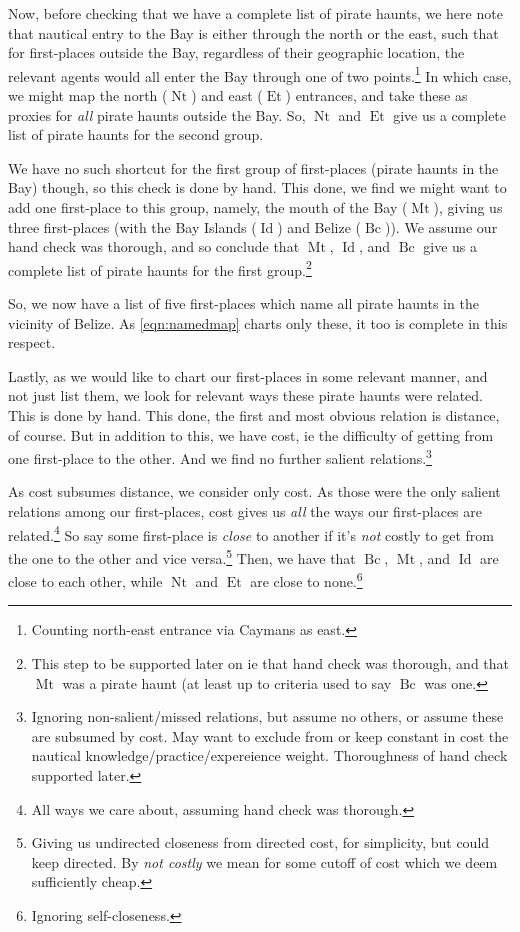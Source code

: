 \documentclass{amsart}
\newcommand{\ment}[1]{\textit{#1}} %
\DeclareMathOperator{\id}{Id} %
\DeclareMathOperator{\mt}{Mt} %
\DeclareMathOperator{\bc}{Bc} %
\DeclareMathOperator{\et}{Et} %
\DeclareMathOperator{\nt}{Nt} %
\theoremstyle{definition}
\theoremstyle{remark}
\begin{document}
			Now, before checking that we have a complete list of pirate haunts, we here note that nautical entry to the Bay is either through the north or the east, such that for first-places outside the Bay, regardless of their geographic location, the relevant agents would all enter the Bay through one of two points.\footnote{Counting north-east entrance via Caymans as east.} In which case, we might map the north (\(\nt\)) and east (\(\et\)) entrances, and take these as proxies for \emph{all} pirate haunts outside the Bay. So, \(\nt\) and \(\et\) give us a complete list of pirate haunts for the second group.
		
			We have no such shortcut for the first group of first-places (pirate haunts in the Bay) though, so this check is done by hand. This done, we find we might want to add one first-place to this group, namely, the mouth of the Bay (\(\mt\)), giving us three first-places (with the Bay Islands (\(\id\)) and Belize (\(\bc\))). We assume our hand check was thorough, and so conclude that \(\mt\), \(\id\), and \(\bc\) give us a complete list of pirate haunts for the first group.\footnote{This step to be supported later on ie that hand check was thorough, and that \(\mt\) was a pirate haunt (at least up to criteria used to say \(\bc\) was one.}
		
			So, we now have a list of five first-places which name all pirate haunts in the vicinity of Belize. As \ref{eqn:namedmap} charts only these, it too is complete in this respect.
		
			Lastly, as we would like to chart our first-places in some relevant manner, and not just list them, we look for relevant ways these pirate haunts were related. This is done by hand. This done, the first and most obvious relation is distance, of course. But in addition to this, we have cost, ie the difficulty of getting from one first-place to the other. And we find no further salient relations.\footnote{Ignoring non-salient/missed relations, but assume no others, or assume these are subsumed by cost. May want to exclude from or keep constant in cost the nautical knowledge/practice/expereience weight. Thoroughness of hand check supported later.}
			
			As cost subsumes distance, we consider only cost. As those were the only salient relations among our first-places, cost gives us \emph{all} the ways our first-places are related.\footnote{All ways we care about, assuming hand check was thorough.} So say some first-place is \ment{close} to another if it's \emph{not} costly to get from the one to the other and vice versa.\footnote{Giving us undirected closeness from directed cost, for simplicity, but could keep directed. By \ment{not costly} we mean for some cutoff of cost which we deem sufficiently cheap.} Then, we have that \(\bc\), \(\mt\), and \(\id\) are close to each other, while \(\nt\) and \(\et\) are close to none.\footnote{Ignoring self-closeness.}
			
\end{document}
